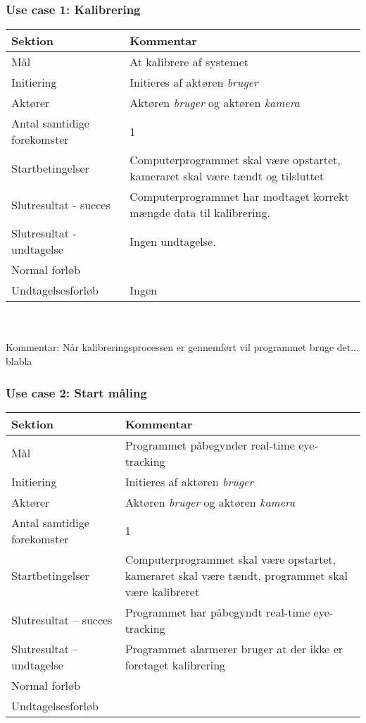 \documentclass[kravspec.tex]{subfiles}
\begin{document}
	\subsubsection{Use case 1: Kalibrering}
	\begin{tabular}{|l|p{7.7cm}|}
		\hline \textbf{Sektion} & \textbf{Kommentar} \\ 
		\hline Mål & At kalibrere af systemet \\ 
		\hline Initiering & Initieres af aktøren \textit{bruger} \\ 
		\hline Aktører & Aktøren \textit{bruger} og aktøren \textit{kamera} \\ 
		\hline Antal samtidige forekomster & 1 \\ 
		\hline Startbetingelser & Computerprogrammet skal være opstartet, kameraret skal være tændt og tilsluttet \\ 	
		\hline Slutresultat - succes & Computerprogrammet har modtaget korrekt mængde data til kalibrering. \\ 
		\hline Slutresultat - undtagelse &  Ingen undtagelse. \\ 
		\hline Normal forløb &  \\ 
		\hline Undtagelsesforløb & Ingen \\ 
		\hline 
	\end{tabular} \\ \\
	Kommentar: Når kalibreringsprocessen er gennemført vil programmet bruge det... blabla
	
	\subsubsection{Use case 2: Start måling}
	\begin{tabular}{|l|p{7.7cm}|}
		\hline \textbf{Sektion} 	& \textbf{Kommentar} \\ 
		\hline Mål  & Programmet påbegynder real-time eye-tracking \\ 
		\hline Initiering  & Initieres af aktøren \textit{bruger} \\ 
		\hline Aktører & Aktøren \textit{bruger} og aktøren \textit{kamera} \\ 
		\hline Antal samtidige forekomster & 1 \\ 
		\hline Startbetingelser & Computerprogrammet skal være opstartet, kameraret skal være tændt, programmet skal være kalibreret  \\ 
		\hline Slutresultat – succes & Programmet har påbegyndt real-time eye-tracking \\ 
		\hline Slutresultat – undtagelse & Programmet alarmerer bruger at der ikke er foretaget kalibrering \\ 
		\hline Normal forløb &  \\ 
		\hline Undtagelsesforløb &  \\ 
		\hline 
	\end{tabular}
\end{document}
